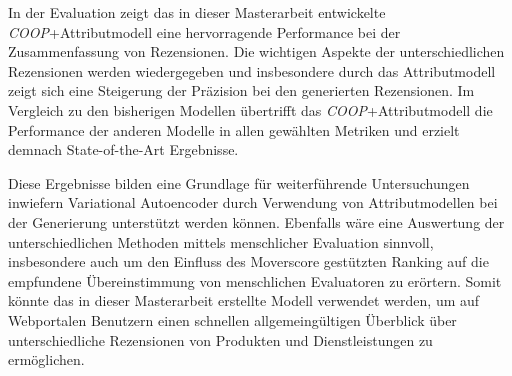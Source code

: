In der Evaluation zeigt das in dieser Masterarbeit entwickelte \textit{COOP}+Attributmodell eine hervorragende Performance bei der Zusammenfassung von Rezensionen. 
Die wichtigen Aspekte der unterschiedlichen Rezensionen werden wiedergegeben und insbesondere durch das Attributmodell zeigt sich eine Steigerung der Präzision bei den generierten Rezensionen. 
Im Vergleich zu den bisherigen Modellen übertrifft das \textit{COOP}+Attributmodell die Performance der anderen Modelle in allen gewählten Metriken und erzielt demnach State-of-the-Art Ergebnisse.

Diese Ergebnisse bilden eine Grundlage für weiterführende Untersuchungen inwiefern Variational Autoencoder durch Verwendung von Attributmodellen bei der Generierung unterstützt werden können.
Ebenfalls wäre eine Auswertung der unterschiedlichen Methoden mittels menschlicher Evaluation sinnvoll, insbesondere auch um den Einfluss des Moverscore gestützten Ranking auf die empfundene Übereinstimmung von menschlichen Evaluatoren zu erörtern.
Somit könnte das in dieser Masterarbeit erstellte Modell verwendet werden, um auf Webportalen Benutzern einen schnellen allgemeingültigen Überblick über unterschiedliche Rezensionen von Produkten und Dienstleistungen zu ermöglichen.



\pagebreak
